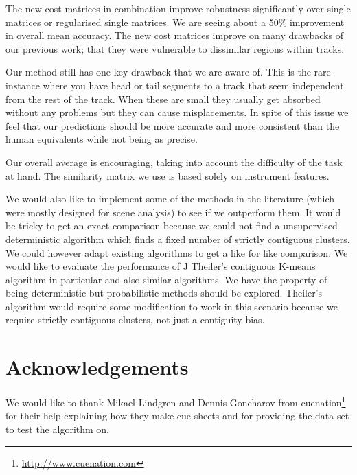 \documentclass[twocolumn]{article}
\begin{document}
The new cost matrices in combination improve robustness significantly over single matrices or regularised single matrices. We are seeing about a 50\% improvement in overall mean accuracy. The new cost matrices improve on many drawbacks of our previous work; that they were vulnerable to dissimilar regions within tracks. 

Our method still has one key drawback that we are aware of. This is the rare instance where you have head or tail segments to a track that seem independent from the rest of the track. When these are small they usually get absorbed without any problems but they can cause misplacements. In spite of this issue we feel that our predictions should be more accurate and more consistent than the human equivalents while not being as precise. 


Our overall average is encouraging, taking into account the difficulty of the task at hand. The similarity matrix we use is based solely on instrument features. 

We would also like to implement some of the methods in the literature (which were mostly designed for scene analysis) to see if we outperform them. It would be tricky to get an exact comparison because we could not find a unsupervised deterministic algorithm which finds a fixed number of strictly contiguous clusters. We could however adapt existing algorithms to get a like for like comparison. We would like to evaluate the performance of J Theiler's contiguous K-means algorithm in particular \cite{theiler1997contiguity} and also similar algorithms. We have the property of being deterministic but probabilistic methods should be explored. Theiler's algorithm would require some modification to work in this scenario because we require strictly contiguous clusters, not just a contiguity bias. 


\section{Acknowledgements}\label{sec:acknowledgements}

We would like to thank Mikael Lindgren and Dennis Goncharov from cuenation\footnote{\url{http://www.cuenation.com}} for their help explaining how they make cue sheets and for providing the data set to test the algorithm on.




\end{document}
